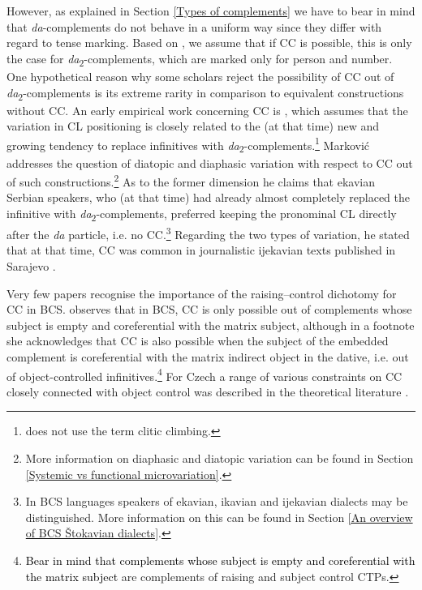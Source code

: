 However, as explained in Section \ref{Types of complements} we have to bear in mind that \textit{da}-com\-ple\-ments do not behave in a uniform way since they differ with regard to tense marking. Based on \citet{Todorovic12}, we assume that if CC is possible, this is only the case for \textit{da}\textsubscript{2}-complements, which are marked only for person and number. One hypothetical reason why some scholars reject the possibility of CC out of \textit{da}\textsubscript{2}-complements is its extreme rarity in comparison to equivalent constructions without CC. An early empirical work concerning CC is \citet{Markovic55}, which assumes that the variation in CL positioning is closely related to the (at that time) new and growing tendency to replace infinitives with \textit{da}\textsubscript{2}-complements.\footnote{\textcolor{black}{\citet{Markovic55}} does not use the term clitic climbing.} Marković addresses the question of diatopic and diaphasic variation with respect to CC out of such constructions.\footnote{More information on diaphasic and diatopic variation can be found in Section \ref{Systemic vs functional microvariation}.} As to the former dimension he claims that ekavian Serbian speakers, who (at that time) had already almost completely replaced the infinitive with \textit{da}\textsubscript{2}-complements, preferred keeping the pronominal CL directly after the \textit{da} particle, i.e. no CC.\footnote{In BCS languages speakers of ekavian, ikavian and ijekavian dialects may be distinguished. More information on this can be found in Section \ref{An overview of BCS Štokavian dialects}.} Regarding the two types of variation, he stated that at that time, CC was common in journalistic ijekavian texts published in Sarajevo \citep[cf.][35--40]{Markovic55}. 

Very few papers recognise the importance of the raising--control dichotomy for CC in BCS. \citet{Aljovic05} observes that in BCS, CC is only possible out of complements whose subject is empty and coreferential with the matrix subject, although in a footnote she acknowledges that CC is also possible when the subject of the embedded complement is coreferential with the matrix indirect object in the dative, i.e. out of object-controlled infinitives.\footnote{\textcolor{black}{Bear in mind that complements whose subject is empty and coreferential with the matrix subject} are complements of raising and subject control CTPs.} For Czech a range of various constraints on CC closely connected with object control was described in the theoretical literature \citep{Rezac05, Dotlacil04, Hana07}. 

